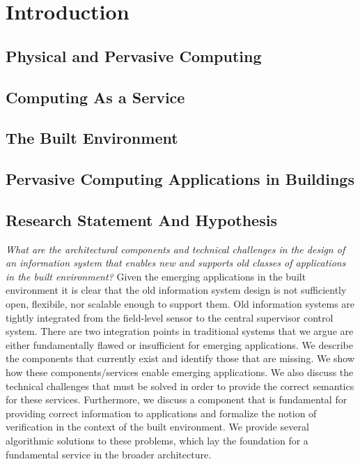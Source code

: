 \documentclass{ucbthesis}
\begin{document}
\pagestyle{headings}


\chapter{Introduction}
\section{Physical and Pervasive Computing}
\section{Computing As a Service}
\section{The Built Environment}
\section{Pervasive Computing Applications in Buildings}
\section{Research Statement And Hypothesis}
\emph{What are the architectural components and technical challenges in the design of an information system
that enables new and supports old classes of applications in the built environment?}  Given the emerging applications in
the built environment it is clear that the old information system design is not sufficiently open, flexibile, nor
scalable enough to support them.  Old information systems are tightly integrated from the field-level sensor to
the central supervisor control system.  There are two integration points in traditional systems that we argue 
are either fundamentally flawed or insufficient for emerging applications.  We describe the components that 
currently exist and identify those that are missing.  We show how these components/services enable emerging applications.  We also
discuss the technical challenges that must be solved in order to provide the correct semantics for these services.
Furthermore, we discuss a component that is fundamental for providing correct information to applications 
and formalize the notion of verification in the context of the built environment.  We provide several algorithmic 
solutions to these problems, which lay the foundation for a fundamental service in the broader architecture.
\end{document}
